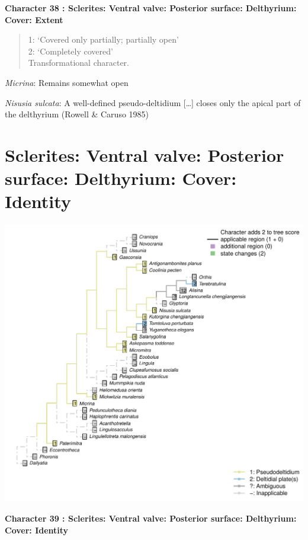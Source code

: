 \documentclass[]{book}
\theoremstyle{definition}
\theoremstyle{definition}
\theoremstyle{definition}
\theoremstyle{remark}
\begin{document}
\textbf{Character 38 : Sclerites: Ventral valve: Posterior surface:
Delthyrium: Cover: Extent }

\begin{quote}
1: `Covered only partially; partially open'\\
2: `Completely covered'\\
Transformational character.
\end{quote}

\emph{Micrina}: Remains somewhat open

\emph{Nisusia sulcata}: A well-defined pseudo-deltidium {[}\ldots{}{]}
closes only the apical part of\\
the delthyrium (Rowell \& Caruso 1985)

\hypertarget{sclerites-ventral-valve-posterior-surface-delthyrium-cover-identity}{%
\section*{Sclerites: Ventral valve: Posterior surface: Delthyrium:
Cover:
Identity}\label{sclerites-ventral-valve-posterior-surface-delthyrium-cover-identity}}

\includegraphics{Brachiopod_phylogeny_files/figure-latex/unnamed-chunk-5-39.pdf}

\textbf{Character 39 : Sclerites: Ventral valve: Posterior surface:
Delthyrium: Cover: Identity }
\end{document}
